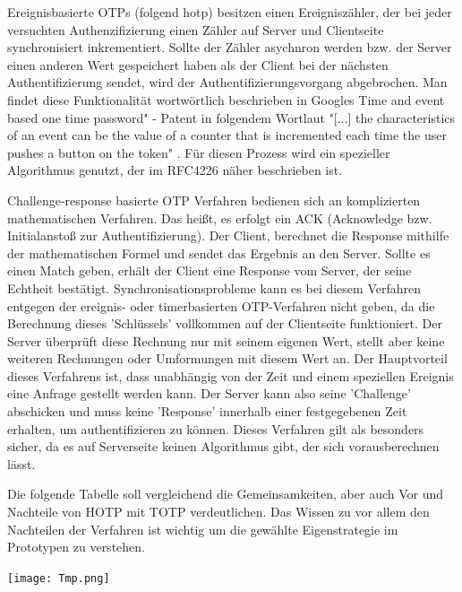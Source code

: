 Ereignisbasierte OTPs (folgend \ac{hotp}) besitzen einen Ereigniszähler, der bei jeder versuchten Authenzifizierung einen Zähler auf Server und Clientseite synchronisiert inkrementiert. Sollte der Zähler asychnron werden bzw. der Server einen anderen Wert gespeichert haben als der Client bei der nächsten Authentifizierung sendet, wird der Authentifizierungsvorgang abgebrochen. Man findet diese Funktionalität wortwörtlich beschrieben in Googles Time and event based one time password" - Patent \cite{A6} in folgendem Wortlaut "[...] the characteristics of an event can be the value of a counter that is incremented each time the user pushes a button on the token" \cite{A6}. Für diesen Prozess wird ein spezieller Algorithmus genutzt, der im RFC4226 näher beschrieben ist.

Challenge-response basierte OTP Verfahren bedienen sich an komplizierten mathematischen Verfahren. Das heißt, es erfolgt ein ACK (Acknowledge bzw. Initialanstoß zur Authentifizierung). Der Client, berechnet die Response mithilfe der mathematischen Formel und sendet das Ergebnis an den Server. Sollte es einen Match geben, erhält der Client eine Response vom Server, der seine Echtheit bestätigt. Synchronisationsprobleme kann es bei diesem Verfahren entgegen der ereignis- oder timerbasierten OTP-Verfahren nicht geben, da die Berechnung dieses 'Schlüssels' vollkommen auf der Clientseite funktioniert. Der Server überprüft diese Rechnung nur mit seinem eigenen Wert, stellt aber keine weiteren Rechnungen oder Umformungen mit diesem Wert an. Der Hauptvorteil dieses Verfahrens ist, dass unabhängig von der Zeit und einem speziellen Ereignis eine Anfrage gestellt werden kann. Der Server kann also seine 'Challenge' abschicken und muss keine 'Response' innerhalb einer festgegebenen Zeit erhalten, um authentifizieren zu können. Dieses Verfahren gilt als besonders sicher, da es auf Serverseite keinen Algorithmus gibt, der sich vorausberechnen lässt.

Die folgende Tabelle soll vergleichend die Gemeinsamkeiten, aber auch Vor und Nachteile von HOTP mit TOTP verdeutlichen. Das Wissen zu vor allem den Nachteilen der Verfahren ist wichtig um die gewählte Eigenstrategie im Prototypen zu verstehen.

\texttt{[image: Tmp.png]}

